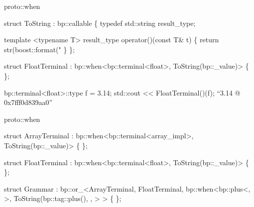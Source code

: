 
\begin{frame}[fragile]{proto::when}
\begin{semiverbatim}
struct ToString : bp::callable
\{
  typedef std::string result_type;
  
  template <typename T>
  result_type operator()(const T& t)
  \{
    return str(boost::format("%
  \}
\};

struct FloatTerminal
  : bp::when<bp::terminal<float>, ToString(bp::_value)>
\{ \};

bp::terminal<float>::type f = {3.14}; 
std::cout << FloatTerminal()(f);  
``3.14 @ 0x7fff0d839aa0''

\end{semiverbatim}
\note{ }
\end{frame}


\begin{frame}[fragile]{proto::when}
\begin{semiverbatim}
struct \alert<3>{ArrayTerminal}
  : bp::when<\alert<2,8>{bp::terminal<\alert<9>{array_impl}>}, \alert<11>{ToString(bp::_value)}>
\{ \};

struct \alert<5>{FloatTerminal}
  : bp::when<\alert<4>{bp::terminal<float>}, ToString(bp::_value)>
\{ \};

struct Grammar : 
  bp::or_<ArrayTerminal,
          FloatTerminal,
          bp::when<\alert<6>{bp::plus<, 
                            >},
                   \alert<7>{ToString(\alert<14>{bp::tag::plus()},
                            ,
                            }>
	    >
\{ \};      
\end{semiverbatim}
\note{ }
\end{frame}


